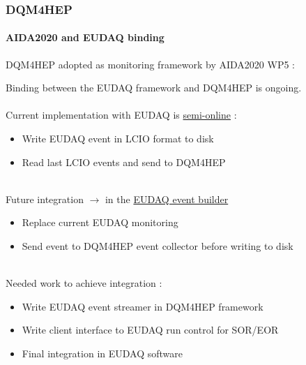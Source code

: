 \documentclass[presentation, 10pt]{beamer}
\begin{document}
\begin{frame}
  \frametitle{DQM4HEP}
  \framesubtitle{AIDA2020 and EUDAQ binding}
  \scriptsize
  DQM4HEP adopted as monitoring framework by AIDA2020 WP5 :
  \begin{center}
  \end{center}
  Binding between the EUDAQ framework and DQM4HEP is ongoing.\\
  ~\\
  Current implementation with EUDAQ is \underline{semi-online} :
  \begin{itemize}
    \item Write EUDAQ event in LCIO format to disk
    \item Read last LCIO events and send to DQM4HEP
  \end{itemize}
  ~\\
  Future integration $\rightarrow$ in the \underline{EUDAQ event builder}
  \begin{itemize}
    \item Replace current EUDAQ monitoring
    \item Send event to DQM4HEP event collector before writing to disk
  \end{itemize}
  ~\\
  Needed work to achieve integration :
  \begin{itemize}
    \item Write EUDAQ event streamer in DQM4HEP framework
    \item Write client interface to EUDAQ run control for SOR/EOR
    \item Final integration in EUDAQ software
  \end{itemize}
\end{frame}
\end{document}
